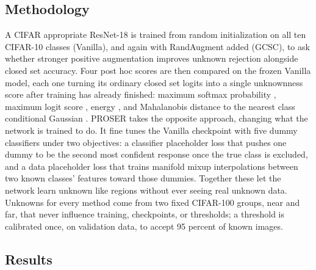 \documentclass{article}
\begin{document}
\subsection{Methodology}

A CIFAR appropriate ResNet-18 is trained from random initialization on all
ten CIFAR-10 classes (Vanilla), and again with RandAugment added (GCSC),
to ask whether stronger positive augmentation improves unknown rejection
alongside closed set accuracy. Four post hoc scores are then compared on
the frozen Vanilla model, each one turning its ordinary closed set logits
into a single unknownness score after training has already finished:
maximum softmax probability \citep{hendrycks2017baseline}, maximum logit
score \citep{vaze2022openset}, energy \citep{liu2020energybased}, and
Mahalanobis distance to the nearest class conditional Gaussian
\citep{lee2018simple}. PROSER \citep{zhou2021learning} takes the opposite
approach, changing what the network is trained to do. It fine tunes the Vanilla checkpoint
with five dummy classifiers under two objectives: a classifier placeholder
loss that pushes one dummy to be the second most confident response once
the true class is excluded, and a data placeholder loss that trains
manifold mixup interpolations between two known classes' features toward
those dummies. Together these let the network learn unknown like regions
without ever seeing real unknown data. Unknowns for every method come from two fixed
CIFAR-100 groups, near and far, that never influence training,
checkpoints, or thresholds; a threshold is calibrated once, on validation
data, to accept 95 percent of known images.

\subsection{Results}
\end{document}
